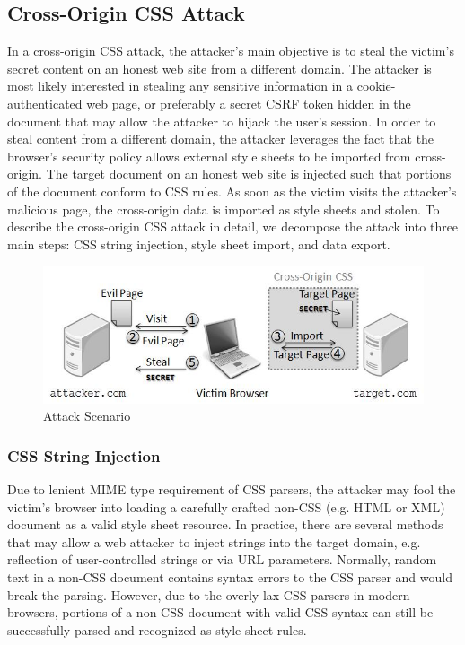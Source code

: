 \documentclass{acm_proc_article-sp}
\begin{document}
{\subsection{Cross-Origin CSS Attack}
In a cross-origin CSS attack, the attacker's main objective is to steal the victim's secret content on an honest web site from a different domain. The attacker is most likely interested in stealing any sensitive information in a cookie-authenticated web page, or preferably a secret CSRF token\cite{csrf} hidden in the document that may allow the attacker to hijack the user's session. In order to steal content from a different domain, the attacker leverages the fact that the browser's security policy allows external style sheets to be imported from cross-origin. The target document on an honest web site is injected such that portions of the document conform to CSS rules. As soon as the victim visits the attacker's malicious page, the cross-origin data is imported as style sheets and stolen. To describe the cross-origin CSS attack in detail, we decompose the attack into three main steps: CSS string injection, style sheet import, and data export.

\begin{figure}
\centering
\includegraphics[width=\linewidth]{scenario.jpg}
\caption{Attack Scenario}
\end{figure}

\subsubsection{CSS String Injection}
Due to lenient MIME type requirement of CSS parsers, the attacker may fool the victim's browser into loading a carefully crafted non-CSS (e.g. HTML or XML) document as a valid style sheet resource. In practice, there are several methods that may allow a web attacker to inject strings into the target domain, e.g. reflection of user-controlled strings or via URL parameters. Normally, random text in a non-CSS document contains syntax errors to the CSS parser and would break the parsing. However, due to the overly lax CSS parsers in modern browsers, portions of a non-CSS document with valid CSS syntax can still be successfully parsed and recognized as style sheet rules.

}
\end{document}
